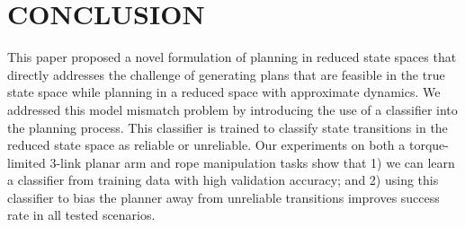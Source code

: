 

\section{CONCLUSION}

\label{sec:conclusion}


This paper proposed a novel formulation of planning in reduced state spaces that directly addresses the challenge of generating plans that are feasible in the true state space while planning in a reduced space with approximate dynamics. We addressed this model mismatch problem by introducing the use of a classifier into the planning process. This classifier is trained to classify state transitions in the reduced state space as reliable or unreliable. Our experiments on both a torque-limited 3-link planar arm and rope manipulation tasks show that 1) we can learn a classifier from training data with high validation accuracy; and 2) using this classifier to bias the planner away from unreliable transitions improves success rate in all tested scenarios.


